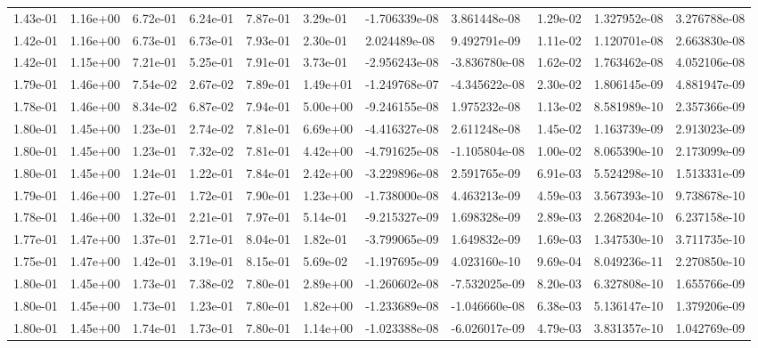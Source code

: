 \begin{longtable}{| p{} | p{} |}
1.43e-01 & 1.16e+00 & 6.72e-01 & 6.24e-01 & 7.87e-01 & 3.29e-01 & -1.706339e-08 &  3.861448e-08 &  1.29e-02 &  1.327952e-08 &  3.276788e-08 \\
1.42e-01 & 1.16e+00 & 6.73e-01 & 6.73e-01 & 7.93e-01 & 2.30e-01 &  2.024489e-08 &  9.492791e-09 &  1.11e-02 &  1.120701e-08 &  2.663830e-08 \\
1.42e-01 & 1.15e+00 & 7.21e-01 & 5.25e-01 & 7.91e-01 & 3.73e-01 & -2.956243e-08 & -3.836780e-08 &  1.62e-02 &  1.763462e-08 &  4.052106e-08 \\
1.79e-01 & 1.46e+00 & 7.54e-02 & 2.67e-02 & 7.89e-01 & 1.49e+01 & -1.249768e-07 & -4.345622e-08 &  2.30e-02 &  1.806145e-09 &  4.881947e-09 \\
1.78e-01 & 1.46e+00 & 8.34e-02 & 6.87e-02 & 7.94e-01 & 5.00e+00 & -9.246155e-08 &  1.975232e-08 &  1.13e-02 &  8.581989e-10 &  2.357366e-09 \\
1.80e-01 & 1.45e+00 & 1.23e-01 & 2.74e-02 & 7.81e-01 & 6.69e+00 & -4.416327e-08 &  2.611248e-08 &  1.45e-02 &  1.163739e-09 &  2.913023e-09 \\
1.80e-01 & 1.45e+00 & 1.23e-01 & 7.32e-02 & 7.81e-01 & 4.42e+00 & -4.791625e-08 & -1.105804e-08 &  1.00e-02 &  8.065390e-10 &  2.173099e-09 \\
1.80e-01 & 1.45e+00 & 1.24e-01 & 1.22e-01 & 7.84e-01 & 2.42e+00 & -3.229896e-08 &  2.591765e-09 &  6.91e-03 &  5.524298e-10 &  1.513331e-09 \\
1.79e-01 & 1.46e+00 & 1.27e-01 & 1.72e-01 & 7.90e-01 & 1.23e+00 & -1.738000e-08 &  4.463213e-09 &  4.59e-03 &  3.567393e-10 &  9.738678e-10 \\
1.78e-01 & 1.46e+00 & 1.32e-01 & 2.21e-01 & 7.97e-01 & 5.14e-01 & -9.215327e-09 &  1.698328e-09 &  2.89e-03 &  2.268204e-10 &  6.237158e-10 \\
1.77e-01 & 1.47e+00 & 1.37e-01 & 2.71e-01 & 8.04e-01 & 1.82e-01 & -3.799065e-09 &  1.649832e-09 &  1.69e-03 &  1.347530e-10 &  3.711735e-10 \\
1.75e-01 & 1.47e+00 & 1.42e-01 & 3.19e-01 & 8.15e-01 & 5.69e-02 & -1.197695e-09 &  4.023160e-10 &  9.69e-04 &  8.049236e-11 &  2.270850e-10 \\
1.80e-01 & 1.45e+00 & 1.73e-01 & 7.38e-02 & 7.80e-01 & 2.89e+00 & -1.260602e-08 & -7.532025e-09 &  8.20e-03 &  6.327808e-10 &  1.655766e-09 \\
1.80e-01 & 1.45e+00 & 1.73e-01 & 1.23e-01 & 7.80e-01 & 1.82e+00 & -1.233689e-08 & -1.046660e-08 &  6.38e-03 &  5.136147e-10 &  1.379206e-09 \\
1.80e-01 & 1.45e+00 & 1.74e-01 & 1.73e-01 & 7.80e-01 & 1.14e+00 & -1.023388e-08 & -6.026017e-09 &  4.79e-03 &  3.831357e-10 &  1.042769e-09 \\

\end{longtable}
